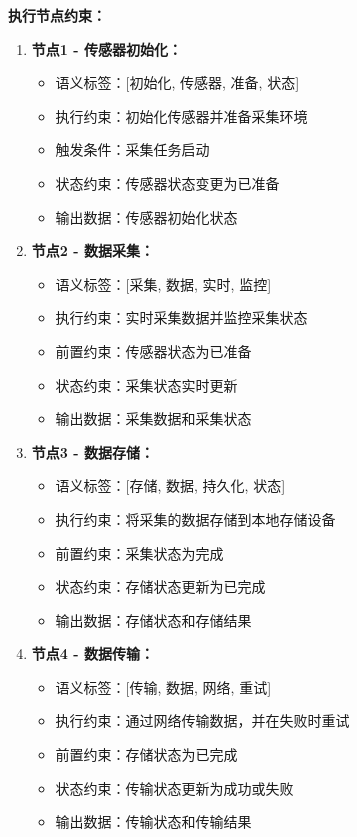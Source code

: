 \documentclass[fontset=windows]{article}
\begin{document}
\textbf{执行节点约束：}
\begin{enumerate}
    \item \textbf{节点1 - 传感器初始化：}
    \begin{itemize}
        \item 语义标签：[初始化, 传感器, 准备, 状态]
        \item 执行约束：初始化传感器并准备采集环境
        \item 触发条件：采集任务启动
        \item 状态约束：传感器状态变更为已准备
        \item 输出数据：传感器初始化状态
    \end{itemize}

    \item \textbf{节点2 - 数据采集：}
    \begin{itemize}
        \item 语义标签：[采集, 数据, 实时, 监控]
        \item 执行约束：实时采集数据并监控采集状态
        \item 前置约束：传感器状态为已准备
        \item 状态约束：采集状态实时更新
        \item 输出数据：采集数据和采集状态
    \end{itemize}

    \item \textbf{节点3 - 数据存储：}
    \begin{itemize}
        \item 语义标签：[存储, 数据, 持久化, 状态]
        \item 执行约束：将采集的数据存储到本地存储设备
        \item 前置约束：采集状态为完成
        \item 状态约束：存储状态更新为已完成
        \item 输出数据：存储状态和存储结果
    \end{itemize}

    \item \textbf{节点4 - 数据传输：}
    \begin{itemize}
        \item 语义标签：[传输, 数据, 网络, 重试]
        \item 执行约束：通过网络传输数据，并在失败时重试
        \item 前置约束：存储状态为已完成
        \item 状态约束：传输状态更新为成功或失败
        \item 输出数据：传输状态和传输结果
    \end{itemize}
\end{enumerate}
\end{document}
